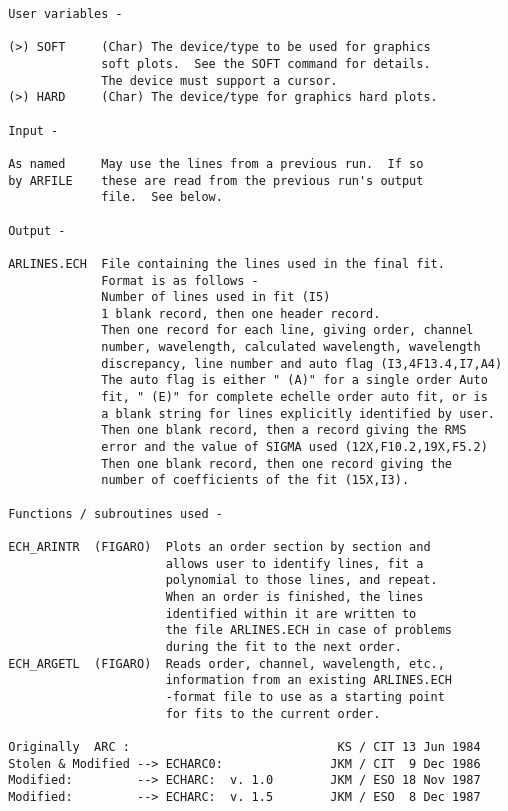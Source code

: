 \begin{description}
\begin{verbatim}
 User variables -

 (>) SOFT     (Char) The device/type to be used for graphics
              soft plots.  See the SOFT command for details.
              The device must support a cursor.
 (>) HARD     (Char) The device/type for graphics hard plots.

 Input -

 As named     May use the lines from a previous run.  If so
 by ARFILE    these are read from the previous run's output
              file.  See below.

 Output -

 ARLINES.ECH  File containing the lines used in the final fit.
              Format is as follows -
              Number of lines used in fit (I5)
              1 blank record, then one header record.
              Then one record for each line, giving order, channel
              number, wavelength, calculated wavelength, wavelength
              discrepancy, line number and auto flag (I3,4F13.4,I7,A4)
              The auto flag is either " (A)" for a single order Auto
              fit, " (E)" for complete echelle order auto fit, or is
              a blank string for lines explicitly identified by user.
              Then one blank record, then a record giving the RMS
              error and the value of SIGMA used (12X,F10.2,19X,F5.2)
              Then one blank record, then one record giving the
              number of coefficients of the fit (15X,I3).

 Functions / subroutines used -

 ECH_ARINTR  (FIGARO)  Plots an order section by section and
                       allows user to identify lines, fit a
                       polynomial to those lines, and repeat.
                       When an order is finished, the lines
                       identified within it are written to
                       the file ARLINES.ECH in case of problems
                       during the fit to the next order.
 ECH_ARGETL  (FIGARO)  Reads order, channel, wavelength, etc.,
                       information from an existing ARLINES.ECH
                       -format file to use as a starting point
                       for fits to the current order.

 Originally  ARC :                             KS / CIT 13 Jun 1984
 Stolen & Modified --> ECHARC0:               JKM / CIT  9 Dec 1986
 Modified:         --> ECHARC:  v. 1.0        JKM / ESO 18 Nov 1987
 Modified:         --> ECHARC:  v. 1.5        JKM / ESO  8 Dec 1987
\end{verbatim}
\end{description}
